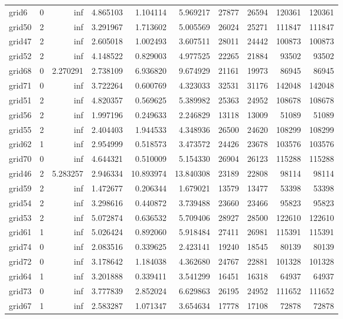 \begin{longtable}{|l|r|r|r|r|r|r|r|r|r|}
grid6 & 0 & inf & 4.865103 & 1.104114 & 5.969217 & 27877 & 26594 & 120361 & 120361 \\
grid50 & 2 & inf & 3.291967 & 1.713602 & 5.005569 & 26024 & 25271 & 111847 & 111847 \\
grid47 & 2 & inf & 2.605018 & 1.002493 & 3.607511 & 28011 & 24442 & 100873 & 100873 \\
grid52 & 2 & inf & 4.148522 & 0.829003 & 4.977525 & 22265 & 21884 & 93502 & 93502 \\
grid68 & 0 & 2.270291 & 2.738109 & 6.936820 & 9.674929 & 21161 & 19973 & 86945 & 86945 \\
grid71 & 0 & inf & 3.722264 & 0.600769 & 4.323033 & 32531 & 31176 & 142048 & 142048 \\
grid51 & 2 & inf & 4.820357 & 0.569625 & 5.389982 & 25363 & 24952 & 108678 & 108678 \\
grid56 & 2 & inf & 1.997196 & 0.249633 & 2.246829 & 13118 & 13009 & 51089 & 51089 \\
grid55 & 2 & inf & 2.404403 & 1.944533 & 4.348936 & 26500 & 24620 & 108299 & 108299 \\
grid62 & 1 & inf & 2.954999 & 0.518573 & 3.473572 & 24426 & 23678 & 103576 & 103576 \\
grid70 & 0 & inf & 4.644321 & 0.510009 & 5.154330 & 26904 & 26123 & 115288 & 115288 \\
grid46 & 2 & 5.283257 & 2.946334 & 10.893974 & 13.840308 & 23189 & 22808 & 98114 & 98114 \\
grid59 & 2 & inf & 1.472677 & 0.206344 & 1.679021 & 13579 & 13477 & 53398 & 53398 \\
grid54 & 2 & inf & 3.298616 & 0.440872 & 3.739488 & 23660 & 23466 & 95823 & 95823 \\
grid53 & 2 & inf & 5.072874 & 0.636532 & 5.709406 & 28927 & 28500 & 122610 & 122610 \\
grid61 & 1 & inf & 5.026424 & 0.892060 & 5.918484 & 27411 & 26981 & 115391 & 115391 \\
grid74 & 0 & inf & 2.083516 & 0.339625 & 2.423141 & 19240 & 18545 & 80139 & 80139 \\
grid72 & 0 & inf & 3.178642 & 1.184038 & 4.362680 & 24767 & 22881 & 101328 & 101328 \\
grid64 & 1 & inf & 3.201888 & 0.339411 & 3.541299 & 16451 & 16318 & 64937 & 64937 \\
grid73 & 0 & inf & 3.777839 & 2.852024 & 6.629863 & 26195 & 24952 & 111652 & 111652 \\
grid67 & 1 & inf & 2.583287 & 1.071347 & 3.654634 & 17778 & 17108 & 72878 & 72878 \\

\end{longtable}
